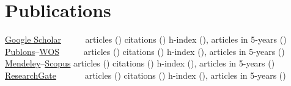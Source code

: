 \documentclass[11pt,a4paper]{moderncv}
\begin{document}
{{%
}{
  \section{Publications}
       \cventry{\aiGoogleScholar}
             {\href{https://scholar.google.es/citations?user=hIl4ixAAAAAJ\&hl}{Google Scholar}}
             {\normalsize \normalfont ~~~~~articles (\totalGoogle{})}
             {\normalsize citations (\citationGoogle{})}
             {\normalsize h-index (\HindexGoogle{}), articles in 5-years (\fiveYearsGoogle{})}{}
     \cventry{\aiPublons}
             {\href{https://publons.com/researcher/1711633}{Publons}--\href{https://app.webofknowledge.com/author/\#/record/5462071}{WOS}}
             {\normalsize \normalfont ~~~~~articles (\totalWOS{})}
             {\normalsize citations (\citationWOS{})}
             {\normalsize h-index (\HindexWOS{}), articles in 5-years (\fiveYearsWOS{})}{}
     \cventry{\aiMendeley}
             {\href{https://www.mendeley.com/profiles/carlos-contreras-bolton/}{Mendeley}--\href{https://www.scopus.com/authid/detail.uri?authorId=55097104500}{Scopus}}
             {\normalsize \normalfont articles (\totalScopus{})}
             {\normalsize citations (\citationScopus{})}
             {\normalsize h-index (\HindexScopus{}), articles in 5-years (\fiveYearsScopus{})}{}
     \cventry{\aiResearchGate}
             {\href{https://www.researchgate.net/profile/Carlos\_Contreras\_Bolton}{ResearchGate}}
             {\normalsize \normalfont ~~~~~~articles (\totalRG{})}
             {\normalsize citations (\citationRG{})}
             {\normalsize h-index (\HindexRG{}), articles in 5-years (\fiveYearsRG{})}{}
}}
\end{document}
